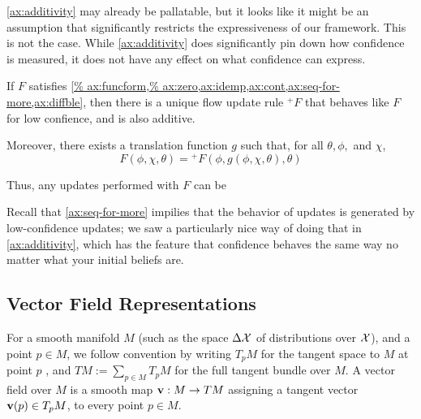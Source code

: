 \cref{ax:additivity} may already be pallatable, but it looks like
it might be an assumption that significantly restricts the expressiveness
of our framework. This is not the case.
While \cref{ax:additivity} does significantly pin down how confidence is measured, it does not have any effect on what confidence can express.  


\begin{theorem}
	If $F$ satisfies \cref{%
		ax:funcform,%
		ax:zero,ax:idemp,ax:cont,ax:seq-for-more,ax:diffble},
	then there is a unique 
	flow update rule
	 $^+\!F$
	that behaves like $F$ for low confience,
	and is also additive. 
	
	Moreover, there exists a translation function $g$ such that,
	for all $\theta,\phi,$ and $\chi$,
	\[
		F( \phi, 
			\chi,
		 \theta )
		 =
		{^+}\!F(\phi, 
		g(\phi,\chi,\theta),
		 \theta)
	\]
\end{theorem}
Thus, any updates performed with $F$ can be  


Recall that \cref{ax:seq-for-more} impilies that the behavior of updates
is generated by low-confidence updates; we saw a particularly nice
way of doing that in \cref{ax:additivity},
which has the feature that confidence behaves the same way no matter what your initial beliefs are. 


% 


\subsection{Vector Field Representations}

\label{sec:vecrep}
For a smooth manifold $M$
(such as the space $\Delta \mathcal X$ of distributions over $\mathcal X$),
and a point $p \in M$, we follow convention by writing $T_p M$ for the tangent space to $M$ at point $p$ \parencite{lee2013smooth}, and %
$TM := \sum_{p \in M} T_p M$ for the full tangent bundle over $M$.
%
A vector field over $M$ is a smooth map $\mathbf{v} : M \to T M$ assigning a tangent vector $\mathbf{v}(p) \in T_p M$, to every point $p \in M$.

